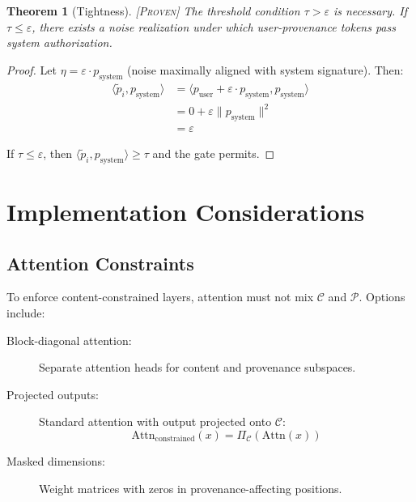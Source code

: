 \documentclass[11pt,a4paper]{article}
\theoremstyle{plain}
\newtheorem{theorem}{Theorem}[section]
\theoremstyle{definition}
\theoremstyle{remark}
\newcommand{\Cspace}{\mathcal{C}}
\newcommand{\Pspace}{\mathcal{P}}
\newcommand{\ip}[2]{\langle #1, #2 \rangle}
\newcommand{\norm}[1]{\| #1 \|}
\newcommand{\proj}[1]{\Pi_{#1}}
\newcommand{\Attn}{\mathrm{Attn}}
\newcommand{\proven}{\textsc{[Proven]}}
\begin{document}
\begin{theorem}[Tightness] \label{thm:tightness} \proven
The threshold condition $\tau > \varepsilon$ is necessary. If $\tau \leq \varepsilon$, there exists a noise realization under which user-provenance tokens pass system authorization.
\end{theorem}

\begin{proof}
Let $\eta = \varepsilon \cdot p_{\text{system}}$ (noise maximally aligned with system signature). Then:
\begin{align}
\ip{\tilde{p}_i}{p_{\text{system}}} &= \ip{p_{\text{user}} + \varepsilon \cdot p_{\text{system}}}{p_{\text{system}}} \\
&= 0 + \varepsilon\norm{p_{\text{system}}}^2 \\
&= \varepsilon
\end{align}

If $\tau \leq \varepsilon$, then $\ip{\tilde{p}_i}{p_{\text{system}}} \geq \tau$ and the gate permits.
\end{proof}

\section{Implementation Considerations}

\subsection{Attention Constraints}

To enforce content-constrained layers, attention must not mix $\Cspace$ and $\Pspace$. Options include:

\begin{description}
\item[Block-diagonal attention:] Separate attention heads for content and provenance subspaces.

\item[Projected outputs:] Standard attention with output projected onto $\Cspace$:
\begin{equation}
\Attn_{\text{constrained}}(x) = \proj{\Cspace}(\Attn(x))
\end{equation}

\item[Masked dimensions:] Weight matrices with zeros in provenance-affecting positions.
\end{description}
\end{document}

